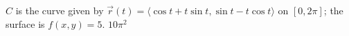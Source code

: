 {$C$ is the curve given by $\vec r(t) = \langle \cos t+t\sin t, \sin t-t\cos t\rangle$ on $[0,2\pi]$; the surface is $f(x,y)=5$.
}
{$10\pi^2$
}
